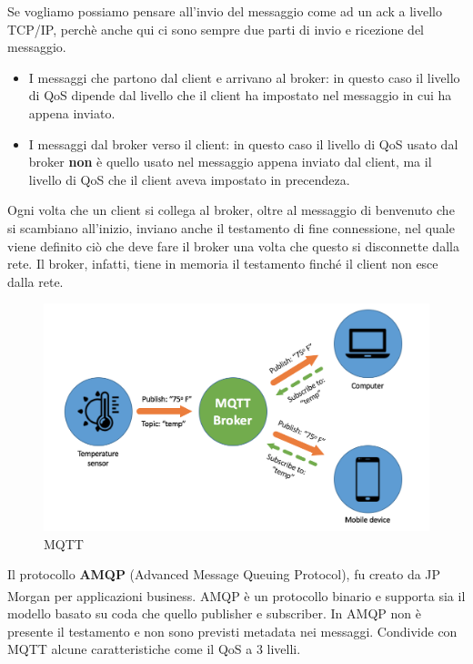 \documentclass[10pt,a4paper,oneside]{scrbook}
\begin{document}
Se vogliamo possiamo pensare all'invio del messaggio come ad un ack a livello TCP/IP, perchè anche qui ci sono sempre due parti di invio e ricezione del messaggio.
\begin{itemize}
    \item I messaggi che partono dal client e arrivano al broker: in questo caso il livello di QoS dipende dal livello che il client ha impostato
    nel messaggio in cui ha appena inviato.
    \item I messaggi dal broker verso il client: in questo caso il livello di QoS usato dal broker \textbf{non} è quello usato nel messaggio appena inviato dal client, 
    ma il livello di QoS che il client aveva impostato in precendeza.
\end{itemize}
Ogni volta che un client si collega al broker, oltre al messaggio di benvenuto che si scambiano all'inizio, inviano anche il testamento di fine connessione, 
nel quale viene definito ciò che deve fare il broker una volta che questo si disconnette dalla rete. Il broker, infatti, tiene in memoria il testamento finché il 
client non esce dalla rete.
\begin{figure}[h]
    \centering
    \includegraphics[width=0.6\linewidth]{img/MQTT.png}
    \caption{MQTT}
    \label{fig:MQTT}
\end{figure}

Il protocollo \textbf{AMQP} (Advanced Message Queuing Protocol), fu creato da JP Morgan\textsuperscript{\textregistered} per applicazioni business.
AMQP è un protocollo binario e supporta sia il modello basato su coda che quello publisher e subscriber. In AMQP non è presente il testamento e non
sono previsti metadata nei messaggi. Condivide con MQTT alcune caratteristiche come il QoS a 3 livelli.
\end{document}
